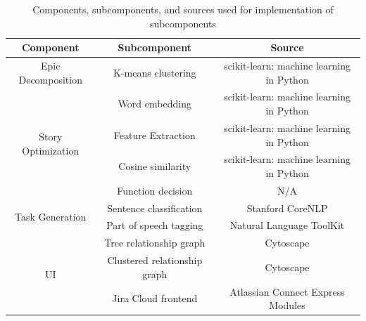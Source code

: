 \begin{table}
\centering
\caption{Components, subcomponents, and sources used for implementation of subcomponents}
\begin{tabular}{ |c|c|c| } 
\hline
\multicolumn{1}{|c|}{\textbf{Component}} & \multicolumn{1}{c|}{\textbf{Subcomponent}} & \multicolumn{1}{c|}{\textbf{Source}} \\
\hline
Epic Decomposition & K-means clustering & scikit-learn: machine learning in Python \cite{scikit} \\
\hline
\multirow{4}{*}{Story Optimization} & Word embedding & scikit-learn: machine learning in Python \cite{scikit} \\ 
\cline{2-3}
& Feature Extraction & scikit-learn: machine learning in Python \cite{scikit} \\ 
\cline{2-3}
& Cosine similarity & scikit-learn: machine learning in Python \cite{scikit} \\
\cline{2-3}
& Function decision & N/A \\ 
\hline
\multirow{2}{*}{Task Generation} & Sentence classification & Stanford CoreNLP \cite{NLP1} \\ 
\cline{2-3}
& Part of speech tagging & Natural Language ToolKit \cite{nltk} \\ 
\hline
\multirow{3}{*}{UI} & Tree relationship graph & Cytoscape \cite{cytoscape} \\ 
\cline{2-3}
& Clustered relationship graph & Cytoscape \cite{cytoscape} \\ 
\cline{2-3}
& Jira Cloud frontend & Atlassian Connect Express Modules \cite{jiraconnect}\\ 
\hline
\end{tabular}
\end{table}
